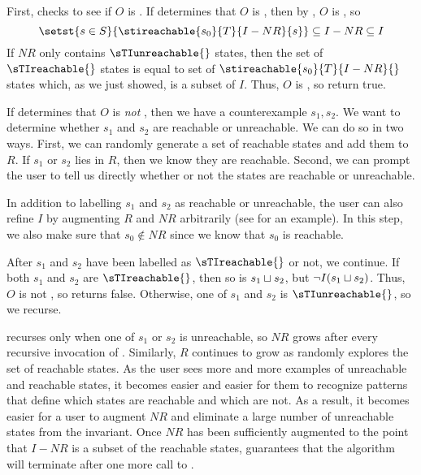 First, \Helper{} checks to see if $O$ is .
%
If \IsIclosed{} determines that $O$ is , then by
, $O$ is , so
\[
  \setst{s \in S}{\stireachable{s_0}{T}{I-NR}{s}}
    \subseteq I - NR
    \subseteq I
\]
If $NR$ only contains $\sTIunreachable{}$ states, then the set of
$\sTIreachable{}$ states is equal to set of $\stireachable{s_0}{T}{I-NR}{}$
states which, as we just showed, is a subset of $I$.  Thus, $O$ is
\sTIconfluent{}, so \Helper{} return true.

If \IsIclosed{} determines that $O$ is \emph{not} , then
we have a counterexample $s_1, s_2$. We want to determine whether $s_1$ and
$s_2$ are reachable or unreachable. We can do so in two ways.
%
First, we can randomly generate a set of reachable states and add them to
$R$. If $s_1$ or $s_2$ lies in $R$, then we know they are reachable.
%
Second, we can prompt the user to tell us directly whether or not the states
are reachable or unreachable.

In addition to labelling $s_1$ and $s_2$ as reachable or unreachable, the user
can also refine $I$ by augmenting $R$ and $NR$ arbitrarily (see
 for an example). In this step, we also make
sure that $s_0 \notin NR$ since we know that $s_0$ is reachable.

After $s_1$ and $s_2$ have been labelled as $\sTIreachable{}$ or not, we
continue. If both $s_1$ and $s_2$ are $\sTIreachable{}$, then so is $s_1 \sqcup
s_2$, but $\lnot I(s_1 \sqcup s_2)$. Thus, $O$ is not \sTIconfluent{}, so
\Helper{} returns false. Otherwise, one of $s_1$ and $s_2$ is
$\sTIunreachable{}$, so we recurse.

\Helper{} recurses only when one of $s_1$ or $s_2$ is unreachable, so $NR$
grows after every recursive invocation of \Helper{}. Similarly, $R$ continues
to grow as \Helper{} randomly explores the set of reachable states. As the user
sees more and more examples of unreachable and reachable states, it becomes
easier and easier for them to recognize patterns that define which states are
reachable and which are not. As a result, it becomes easier for a user to
augment $NR$ and eliminate a large number of unreachable states from the
invariant. Once $NR$ has been sufficiently augmented to the point that $I - NR$
is a subset of the reachable states, 
guarantees that the algorithm will terminate after one more call to \IsIclosed.


